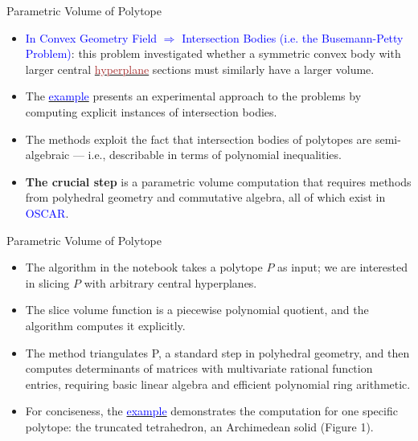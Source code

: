\documentclass[aspectratio=169,xcolor=dvipsnames]{beamer}
\begin{document}
\begin{frame}{Parametric Volume of Polytope}
    \begin{itemize}
        \item \textcolor{blue}{In Convex Geometry Field $\Rightarrow$ Intersection Bodies (i.e. the Busemann-Petty Problem)}: this problem investigated whether a symmetric convex body with larger central \href{https://en.wikipedia.org/wiki/Hyperplane}{\textcolor{brown}{hyperplane}} sections must similarly have a larger volume. 
        \item The \href{https://github.com/micjoswig/oscar-notebooks/blob/master/SIAM-News/Parametrized_volume_of_slices.ipynb}{\textcolor{blue}{example}} presents an experimental approach to the problems by computing explicit instances of intersection bodies. 
        \item The methods exploit the fact that intersection bodies of polytopes are semi-algebraic — i.e., describable in terms of polynomial inequalities. 
        \item \textbf{The crucial step} is a parametric volume computation that requires methods from polyhedral geometry and commutative algebra, all of which exist in \textcolor{blue}{OSCAR}.
    \end{itemize}
\end{frame}


\begin{frame}{Parametric Volume of Polytope}
    \begin{itemize}
        \item The algorithm in the notebook takes a polytope $P$
 as input; we are interested in slicing $P$ with arbitrary central hyperplanes.
 \item The slice volume function is a piecewise polynomial quotient, and the algorithm computes it explicitly.
 \item The method triangulates P, a standard step in polyhedral geometry, and then computes determinants of matrices with multivariate rational function entries, requiring basic linear algebra and efficient polynomial ring arithmetic.
 \item For conciseness, the \href{https://github.com/micjoswig/oscar-notebooks/blob/master/SIAM-News/Parametrized_volume_of_slices.ipynb}{\textcolor{blue}{example}} demonstrates the computation for one specific polytope: the truncated tetrahedron, an Archimedean solid (Figure 1).
    \end{itemize}
\end{frame}
\end{document}

